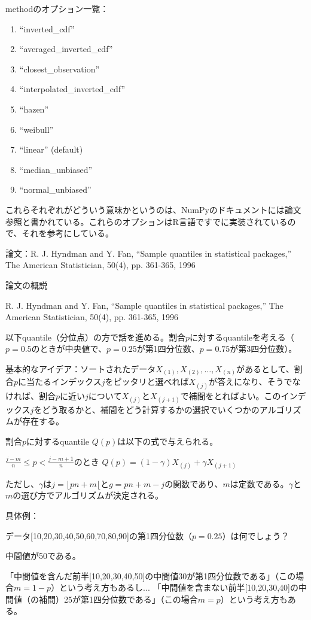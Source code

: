 \documentclass[unicode,lualatex,aspectratio=169]{beamer}
\begin{document}
\begin{frame}[fragile]
  methodのオプション一覧：
  {\tiny
  \begin{enumerate}
  \item ``inverted\_cdf''
  \item ``averaged\_inverted\_cdf''
  \item ``closest\_observation''
  \item ``interpolated\_inverted\_cdf''
  \item ``hazen''
  \item ``weibull''
  \item ``linear'' (default)
  \item ``median\_unbiased''
  \item ``normal\_unbiased''
  \end{enumerate}
  }
  これらそれぞれがどういう意味かというのは、NumPyのドキュメントには論文参照と書かれている。これらのオプションはR言語ですでに実装されているので、それを参考にしている。

  論文：R. J. Hyndman and Y. Fan, “Sample quantiles in statistical packages,” The American Statistician, 50(4), pp. 361-365, 1996
\end{frame}
\begin{frame}[fragile]{論文の概説}

  {\tiny R. J. Hyndman and Y. Fan, “Sample quantiles in statistical packages,” The American Statistician, 50(4), pp. 361-365, 1996}
  
  以下quantile（分位点）の方で話を進める。割合$p$に対するquantileを考える（$p=0.5$のときが中央値で、$p=0.25$が第1四分位数、$p=0.75$が第3四分位数）。

  基本的なアイデア：ソートされたデータ$X_{(1)},X_{(2)},\ldots,X_{(n)}$があるとして、割合$p$に当たるインデックス$j$をピッタリと選べれば$X_{(j)}$が答えになり、そうでなければ、割合$p$に近い$j$について$X_{(j)}$と$X_{(j+1)}$で補間をとればよい。このインデックス$j$をどう取るかと、補間をどう計算するかの選択でいくつかのアルゴリズムが存在する。

  割合$p$に対するquantile $Q(p)$は以下の式で与えられる。

  $\displaystyle \frac{j-m}{n} \leq p < \frac{j-m+1}{n}$のとき
  $Q(p) = (1-\gamma) X_{(j)} + \gamma X_{(j+1)}$

  ただし、$\gamma$は$j=\lfloor pn+m \lfloor$と$g=pn+m-j$の関数であり、$m$は定数である。$\gamma$と$m$の選び方でアルゴリズムが決定される。
  
\end{frame}
\begin{frame}[fragile]
  
  具体例：
  
  データ[10,20,30,40,50,60,70,80,90]の第1四分位数（$p=0.25$）は何でしょう？

  中間値が50である。

  「中間値を含んだ前半[10,20,30,40,50]の中間値30が第1四分位数である」（この場合$m=1-p$）という考え方もあるし...\newline
  「中間値を含まない前半[10,20,30,40]の中間値（の補間）25が第1四分位数である」（この場合$m=p$）という考え方もある。
  
\end{frame}
\end{document}
